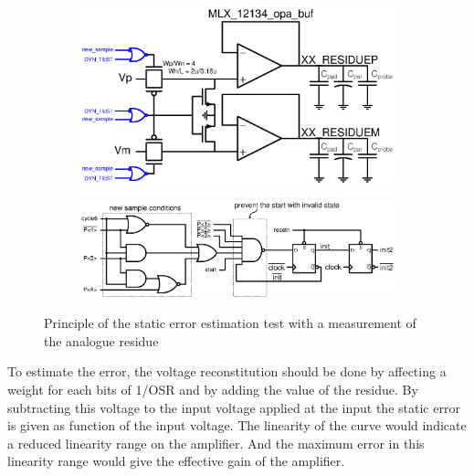 \begin{figure}[htp]
    \centering
    \begin{subfigure}[b]{0.48\textwidth}
        \centering
        \includegraphics[width=\textwidth]{Chapter5/Figs/adc_chip/residuum_measurement_dyn_test.ps}
    \end{subfigure}
    \begin{subfigure}[b]{0.48\textwidth}
        \centering
        \includegraphics[width=\textwidth]{Chapter5/Figs/adc_chip/digital-new-sample.ps}
        \vspace{2em}
    \end{subfigure}
    \caption{Principle of the static error estimation test with a measurement of the analogue residue}
    \label{fig:adc-static-test-buffers-clocking}
\end{figure}

To estimate the error, the voltage reconstitution should be done by affecting a weight for each bits of 1/OSR and by adding the value of the residue. By subtracting this voltage to the input voltage applied at the input the static error is given as function of the input voltage. The linearity of the curve would indicate a reduced linearity range on the amplifier. And the maximum error in this linearity range would give the effective gain of the amplifier.

